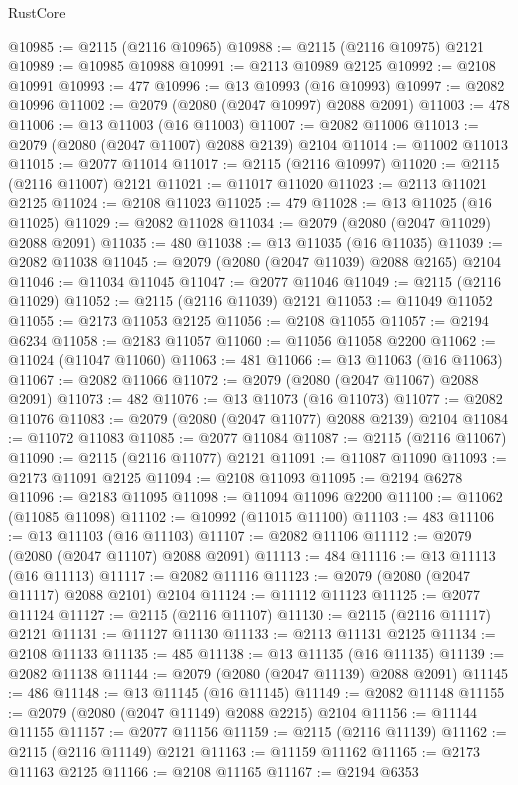 \begin{lexlean}{RustCore}
\begin{coremodule}
@10985 := @2115 (@2116 @10965)
@10988 := @2115 (@2116 @10975) @2121
@10989 := @10985 @10988
@10991 := @2113 @10989 @2125
@10992 := @2108 @10991
@10993 := 477
@10996 := @13 @10993 (@16 @10993)
@10997 := @2082 @10996
@11002 := @2079 (@2080 (@2047 @10997) @2088 @2091)
@11003 := 478
@11006 := @13 @11003 (@16 @11003)
@11007 := @2082 @11006
@11013 := @2079 (@2080 (@2047 @11007) @2088 @2139) @2104
@11014 := @11002 @11013
@11015 := @2077 @11014
@11017 := @2115 (@2116 @10997)
@11020 := @2115 (@2116 @11007) @2121
@11021 := @11017 @11020
@11023 := @2113 @11021 @2125
@11024 := @2108 @11023
@11025 := 479
@11028 := @13 @11025 (@16 @11025)
@11029 := @2082 @11028
@11034 := @2079 (@2080 (@2047 @11029) @2088 @2091)
@11035 := 480
@11038 := @13 @11035 (@16 @11035)
@11039 := @2082 @11038
@11045 := @2079 (@2080 (@2047 @11039) @2088 @2165) @2104
@11046 := @11034 @11045
@11047 := @2077 @11046
@11049 := @2115 (@2116 @11029)
@11052 := @2115 (@2116 @11039) @2121
@11053 := @11049 @11052
@11055 := @2173 @11053 @2125
@11056 := @2108 @11055
@11057 := @2194 @6234
@11058 := @2183 @11057
@11060 := @11056 @11058 @2200
@11062 := @11024 (@11047 @11060)
@11063 := 481
@11066 := @13 @11063 (@16 @11063)
@11067 := @2082 @11066
@11072 := @2079 (@2080 (@2047 @11067) @2088 @2091)
@11073 := 482
@11076 := @13 @11073 (@16 @11073)
@11077 := @2082 @11076
@11083 := @2079 (@2080 (@2047 @11077) @2088 @2139) @2104
@11084 := @11072 @11083
@11085 := @2077 @11084
@11087 := @2115 (@2116 @11067)
@11090 := @2115 (@2116 @11077) @2121
@11091 := @11087 @11090
@11093 := @2173 @11091 @2125
@11094 := @2108 @11093
@11095 := @2194 @6278
@11096 := @2183 @11095
@11098 := @11094 @11096 @2200
@11100 := @11062 (@11085 @11098)
@11102 := @10992 (@11015 @11100)
@11103 := 483
@11106 := @13 @11103 (@16 @11103)
@11107 := @2082 @11106
@11112 := @2079 (@2080 (@2047 @11107) @2088 @2091)
@11113 := 484
@11116 := @13 @11113 (@16 @11113)
@11117 := @2082 @11116
@11123 := @2079 (@2080 (@2047 @11117) @2088 @2101) @2104
@11124 := @11112 @11123
@11125 := @2077 @11124
@11127 := @2115 (@2116 @11107)
@11130 := @2115 (@2116 @11117) @2121
@11131 := @11127 @11130
@11133 := @2113 @11131 @2125
@11134 := @2108 @11133
@11135 := 485
@11138 := @13 @11135 (@16 @11135)
@11139 := @2082 @11138
@11144 := @2079 (@2080 (@2047 @11139) @2088 @2091)
@11145 := 486
@11148 := @13 @11145 (@16 @11145)
@11149 := @2082 @11148
@11155 := @2079 (@2080 (@2047 @11149) @2088 @2215) @2104
@11156 := @11144 @11155
@11157 := @2077 @11156
@11159 := @2115 (@2116 @11139)
@11162 := @2115 (@2116 @11149) @2121
@11163 := @11159 @11162
@11165 := @2173 @11163 @2125
@11166 := @2108 @11165
@11167 := @2194 @6353

\end{coremodule}
\end{lexlean}
